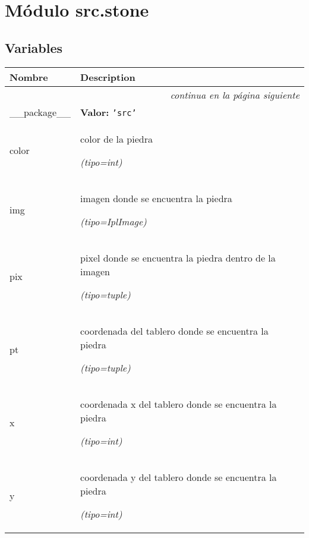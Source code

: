 %
%
%


\section{Módulo src.stone}

    \label{src:stone}


  \subsection{Variables}

    \vspace{-1cm}
\hspace{\varindent}\begin{longtable}{|p{\varnamewidth}|p{\vardescrwidth}|l}
\cline{1-2}
\cline{1-2} \centering \textbf{Nombre} & \centering \textbf{Description}& \\
\cline{1-2}
\endhead\cline{1-2}\multicolumn{3}{r}{\small\textit{continua en la página siguiente}}\\\endfoot\cline{1-2}
\endlastfoot\raggedright \_\-\_\-p\-a\-c\-k\-a\-g\-e\-\_\-\_\- & \raggedright \textbf{Valor:} 
{\tt \texttt{'}\texttt{src}\texttt{'}}&\\
\cline{1-2}
\raggedright c\-o\-l\-o\-r\- & \raggedright color de la piedra

            {\it (tipo=int)}&\\
\cline{1-2}
\raggedright i\-m\-g\- & \raggedright imagen donde se encuentra la piedra

            {\it (tipo=IplImage)}&\\
\cline{1-2}
\raggedright p\-i\-x\- & \raggedright pixel donde se encuentra la piedra dentro de la imagen

            {\it (tipo=tuple)}&\\
\cline{1-2}
\raggedright p\-t\- & \raggedright coordenada del tablero donde se encuentra la piedra

            {\it (tipo=tuple)}&\\
\cline{1-2}
\raggedright x\- & \raggedright coordenada x del tablero donde se encuentra la piedra

            {\it (tipo=int)}&\\
\cline{1-2}
\raggedright y\- & \raggedright coordenada y del tablero donde se encuentra la piedra

            {\it (tipo=int)}&\\
\cline{1-2}
\end{longtable}


